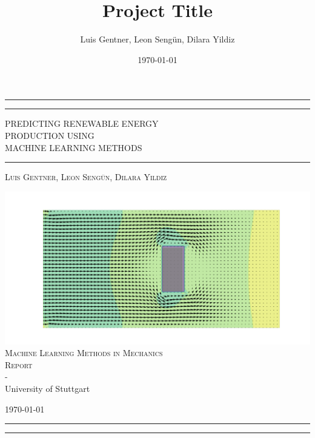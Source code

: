 \documentclass[11pt,table]{article}
\title{Project Title}
\author{Luis Gentner, Leon Sengün, Dilara Yildiz}
\date{\today}
\begin{document}
\begin{titlepage} 
	\centering 
	\rule{\textwidth}{1pt} 
	\vspace{2pt}\vspace{-\baselineskip} 
	\rule{\textwidth}{0.4pt} 
	\vspace{0.1\textheight} 
	
	
	{\Huge PREDICTING RENEWABLE ENERGY }\\[0.5\baselineskip] 
	{\Huge PRODUCTION USING }\\[0.5\baselineskip]
	{\Huge MACHINE LEARNING METHODS} 
	
	
	\vspace{0.025\textheight} 
	\rule{0.3\textwidth}{0.4pt} 
	\vspace{0.1\textheight}
	
	{\Large \textsc{Luis Gentner, Leon Sengün, Dilara Yildiz}} 
	
	\vfill 
	
	\includegraphics[width=0.5\linewidth]{Figures/example_cover.png} \\
	\vspace{0.05\textheight}
	{\large\textsc{Machine Learning Methods in Mechanics \\Report}\\ -\\ University of Stuttgart} 
	
	
	\vspace{0.1\textheight} 
	
	{\normalsize \today}
	
	
	\rule{\textwidth}{0.4pt}
	\vspace{2pt}\vspace{-\baselineskip}
	\rule{\textwidth}{1pt}
	
\end{titlepage}

\end{document}
